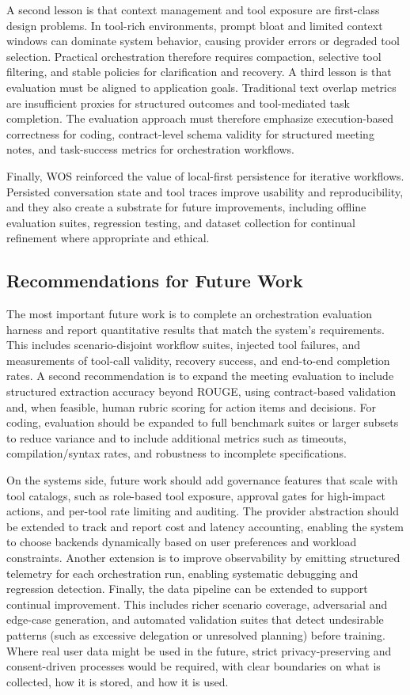 \documentclass[conference]{IEEEtran}
\begin{document}
A second lesson is that context management and tool exposure are first-class design problems. In tool-rich environments, prompt bloat and limited context windows can dominate system behavior, causing provider errors or degraded tool selection. Practical orchestration therefore requires compaction, selective tool filtering, and stable policies for clarification and recovery. A third lesson is that evaluation must be aligned to application goals. Traditional text overlap metrics are insufficient proxies for structured outcomes and tool-mediated task completion. The evaluation approach must therefore emphasize execution-based correctness for coding, contract-level schema validity for structured meeting notes, and task-success metrics for orchestration workflows.

Finally, WOS reinforced the value of local-first persistence for iterative workflows. Persisted conversation state and tool traces improve usability and reproducibility, and they also create a substrate for future improvements, including offline evaluation suites, regression testing, and dataset collection for continual refinement where appropriate and ethical.

\subsection{Recommendations for Future Work}
The most important future work is to complete an orchestration evaluation harness and report quantitative results that match the system’s requirements. This includes scenario-disjoint workflow suites, injected tool failures, and measurements of tool-call validity, recovery success, and end-to-end completion rates. A second recommendation is to expand the meeting evaluation to include structured extraction accuracy beyond ROUGE, using contract-based validation and, when feasible, human rubric scoring for action items and decisions. For coding, evaluation should be expanded to full benchmark suites or larger subsets to reduce variance and to include additional metrics such as timeouts, compilation/syntax rates, and robustness to incomplete specifications.

On the systems side, future work should add governance features that scale with tool catalogs, such as role-based tool exposure, approval gates for high-impact actions, and per-tool rate limiting and auditing. The provider abstraction should be extended to track and report cost and latency accounting, enabling the system to choose backends dynamically based on user preferences and workload constraints. Another extension is to improve observability by emitting structured telemetry for each orchestration run, enabling systematic debugging and regression detection.
Finally, the data pipeline can be extended to support continual improvement. This includes richer scenario coverage, adversarial and edge-case generation, and automated validation suites that detect undesirable patterns (such as excessive delegation or unresolved planning) before training. Where real user data might be used in the future, strict privacy-preserving and consent-driven processes would be required, with clear boundaries on what is collected, how it is stored, and how it is used.
\end{document}
